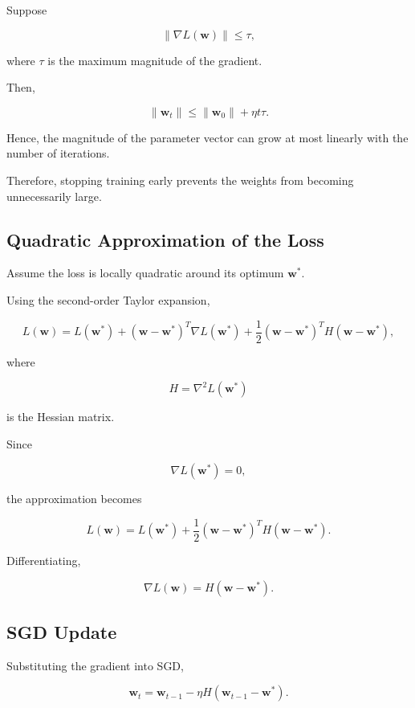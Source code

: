 \documentclass[11pt]{article}
\begin{document}
Suppose

\[
\left\|
\nabla L(\mathbf{w})
\right\|
\le \tau,
\]

where $\tau$ is the maximum magnitude of the gradient.

Then,

\[
\|\mathbf{w}_{t}\|
\le
\|\mathbf{w}_{0}\|
+
\eta t\tau.
\]

Hence, the magnitude of the parameter vector can grow at most linearly
with the number of iterations.

Therefore, stopping training early prevents the weights from becoming
unnecessarily large.


\subsection{Quadratic Approximation of the Loss}

Assume the loss is locally quadratic around its optimum
$\mathbf{w}^{*}$.

Using the second-order Taylor expansion,

\[
L(\mathbf{w})
=
L(\mathbf{w}^{*})
+
(\mathbf{w}-\mathbf{w}^{*})^{T}
\nabla L(\mathbf{w}^{*})
+
\frac12
(\mathbf{w}-\mathbf{w}^{*})^{T}
H
(\mathbf{w}-\mathbf{w}^{*}),
\]

where

\[
H
=
\nabla^{2}L(\mathbf{w}^{*})
\]

is the Hessian matrix.

Since

\[
\nabla L(\mathbf{w}^{*})=0,
\]

the approximation becomes

\[
L(\mathbf{w})
=
L(\mathbf{w}^{*})
+
\frac12
(\mathbf{w}-\mathbf{w}^{*})^{T}
H
(\mathbf{w}-\mathbf{w}^{*}).
\]

Differentiating,

\[
\nabla L(\mathbf{w})
=
H(\mathbf{w}-\mathbf{w}^{*}).
\]


\subsection{SGD Update}

Substituting the gradient into SGD,

\[
\mathbf{w}_{t}
=
\mathbf{w}_{t-1}
-
\eta
H
(\mathbf{w}_{t-1}-\mathbf{w}^{*}).
\]
\end{document}
